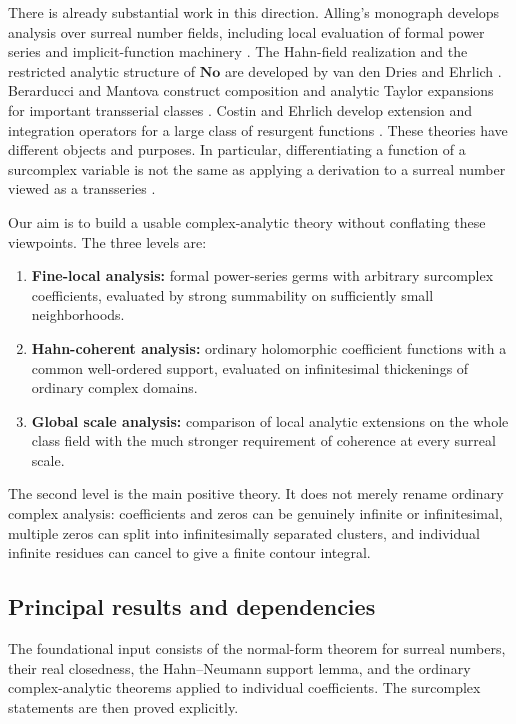 \documentclass[11pt,letterpaper]{article}
\theoremstyle{definition}
\theoremstyle{remark}
\newcommand{\No}{\mathbf{No}}
\numberwithin{equation}{section}
\begin{document}
There is already substantial work in this direction. Alling's monograph develops analysis over surreal number fields, including local evaluation of formal power series and implicit-function machinery \cite{Alling}. The Hahn-field realization and the restricted analytic structure of $\No$ are developed by van den Dries and Ehrlich \cite{vdDE}. Berarducci and Mantova construct composition and analytic Taylor expansions for important transserial classes \cite{BMfunctions}. Costin and Ehrlich develop extension and integration operators for a large class of resurgent functions \cite{CE}. These theories have different objects and purposes. In particular, differentiating a function of a surcomplex variable is not the same as applying a derivation to a surreal number viewed as a transseries \cite{BMderivations}.

Our aim is to build a usable complex-analytic theory without conflating these viewpoints. The three levels are:
\begin{enumerate}
\item \textbf{Fine-local analysis:} formal power-series germs with arbitrary surcomplex coefficients, evaluated by strong summability on sufficiently small neighborhoods.
\item \textbf{Hahn-coherent analysis:} ordinary holomorphic coefficient functions with a common well-ordered support, evaluated on infinitesimal thickenings of ordinary complex domains.
\item \textbf{Global scale analysis:} comparison of local analytic extensions on the whole class field with the much stronger requirement of coherence at every surreal scale.
\end{enumerate}
The second level is the main positive theory. It does not merely rename ordinary complex analysis: coefficients and zeros can be genuinely infinite or infinitesimal, multiple zeros can split into infinitesimally separated clusters, and individual infinite residues can cancel to give a finite contour integral.

\subsection{Principal results and dependencies}
The foundational input consists of the normal-form theorem for surreal numbers, their real closedness, the Hahn--Neumann support lemma, and the ordinary complex-analytic theorems applied to individual coefficients. The surcomplex statements are then proved explicitly.
\end{document}
